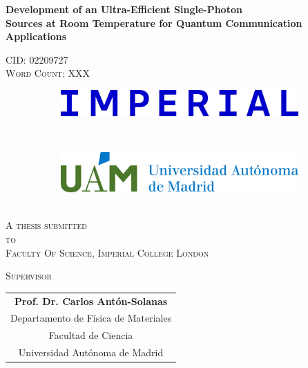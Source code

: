 \begin{center}

{\Large \textbf{Development of an Ultra-Efficient Single-Photon \\ Sources at Room Temperature for Quantum Communication Applications} \\[\stretch{2}]}


\textsc{CID: 02209727 \\ Word Count: XXX}\\[\stretch{2}]

\begin{figure}[hb!t]
     \centering
     \begin{subfigure}[b]{0.5\textwidth}
         \centering
         \includegraphics[width=\textwidth]{Title/ICL_Logo.jpg}
     \end{subfigure}
     ~\\[1 cm]
     \begin{subfigure}[b]{0.5\textwidth}
         \centering
         \includegraphics[width=\textwidth]{Title/UAM_Logo.jpg}
     \end{subfigure}
     \hfill
\end{figure}

~\\[1cm]

\textsc{A thesis submitted \\[1ex]
to \\[1ex]
Faculty Of Science, Imperial College London\\[\stretch{3}]}

\textsc{Supervisor}\\[2ex]

\begin{tabular}[t]{@{}c@{}}
\bfseries Prof. Dr. Carlos Antón-Solanas \\
Departamento de Física de Materiales\\
Facultad de Ciencia \\
Universidad Autónoma de Madrid
\end{tabular}\hfil


\end{center}

\newpage



